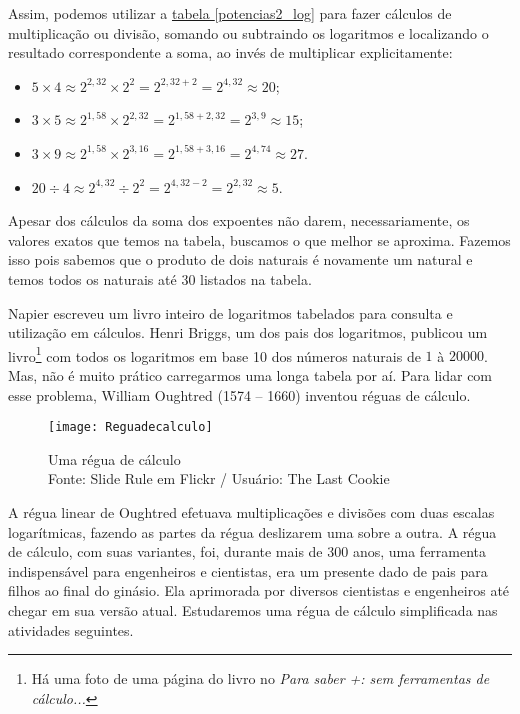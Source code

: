 Assim, podemos utilizar a \hyperref[potencias2_log]{tabela \ref{potencias2_log}} para fazer cálculos de multiplicação ou divisão, somando ou subtraindo  os logaritmos e localizando o resultado correspondente a soma, ao invés de multiplicar explicitamente:
\begin{itemize}
 \item $5 \times 4 \approx 2^{2{,}32} \times 2^2 = 2^{2{,}32 + 2} = 2^{4{,}32} \approx 20$;
 \item $3 \times 5 \approx 2^{1{,}58} \times 2^{2{,}32} = 2^{1{,}58 + 2{,}32} = 2^{3{,}9} \approx 15$;
 \item $3 \times 9 \approx 2^{1{,}58} \times 2^{3{,}16} = 2^{1{,}58+3{,}16} = 2^{4{,}74} \approx 27$.
  \item $20 \div 4 \approx 2^{4{,}32} \div 2^{2} = 2^{4,32-2} = 2^{2{,}32} \approx 5$.
 \end{itemize}

Apesar dos cálculos da soma dos expoentes não darem, necessariamente, os valores exatos que temos na 
tabela, buscamos o que melhor se aproxima. Fazemos isso pois sabemos que o produto de dois naturais é novamente um 
natural e temos todos os naturais até 30 listados na tabela.


Napier escreveu um livro inteiro de logaritmos tabelados para consulta e utilização em cálculos. Henri Briggs, um dos pais dos logaritmos, publicou um livro\footnote{Há uma foto de uma página do livro no \textit{Para saber +: sem ferramentas de cálculo...}} com todos os logaritmos em base 10 dos números naturais de $1$ à $20000$. Mas, não é muito prático carregarmos uma longa tabela por aí. Para lidar com esse problema, William Oughtred  (1574 – 1660) inventou réguas de cálculo.

\begin{figure}
\centering
\texttt{[image: Reguadecalculo]}\\

\caption{Uma régua de cálculo \\ Fonte: Slide Rule em Flickr / Usuário: The Last Cookie} \label{Regua_calc}
\end{figure}

A régua linear de Oughtred efetuava multiplicações e divisões com duas escalas logarítmicas, fazendo as partes da régua deslizarem uma sobre a outra. A régua de cálculo, com suas variantes, foi, durante mais de 300  anos, uma ferramenta indispensável para engenheiros e cientistas, era um presente dado de pais para filhos ao final do 
ginásio. Ela aprimorada por diversos cientistas e engenheiros até chegar em sua versão atual. Estudaremos uma régua de cálculo simplificada nas atividades seguintes.


